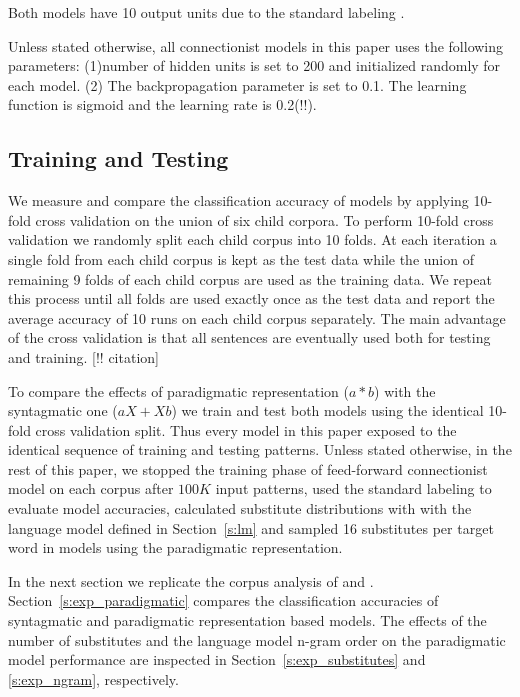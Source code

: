 Both models have 10 output units due to the standard labeling
\citep*{Mintz200391}.

Unless stated otherwise, all connectionist models in this paper uses the
following parameters: (1)number of hidden units is set to 200 and initialized
randomly for each model. (2) The backpropagation parameter is set to 0.1. The 
learning function is sigmoid and the learning rate is 0.2(!!).

\subsection{Training and Testing}
\label{sec:training}

We measure and compare the classification accuracy of models by applying
10-fold cross validation on the union of six child corpora.  To perform 10-fold
cross validation we randomly split each child corpus into 10 folds.  At each
iteration a single fold from each child corpus is kept as the test data while
the union of remaining 9 folds of each child corpus are used as the training
data.  We repeat this process until all folds are used exactly once as the test
data and report the average accuracy of 10 runs on each child corpus
separately.  The main advantage of the cross validation is that all sentences
are eventually used both for testing and training. [!! citation]

To compare the effects of paradigmatic representation ($a*b$) with the
syntagmatic one ($aX+Xb$) we train and test both models using the identical
10-fold cross validation split.  Thus every model in this paper exposed to the
identical sequence of training and testing patterns.  Unless stated otherwise,
in the rest of this paper, we stopped the training phase of feed-forward
connectionist model on each corpus after $100K$ input patterns, used the
standard labeling to evaluate model accuracies, calculated substitute
distributions with with the language model defined in Section~\ref{s:lm} and sampled 16
substitutes per target word in models using the paradigmatic representation.

In the next section we replicate the corpus analysis of \cite{Mintz200391} and
\cite{clair2010}.  Section~\ref{s:exp_paradigmatic} compares the classification
accuracies of syntagmatic and paradigmatic representation based models.  The
effects of the number of substitutes and the language model n-gram order on the
paradigmatic model performance are inspected in Section~\ref{s:exp_substitutes}
and \ref{s:exp_ngram}, respectively. 

